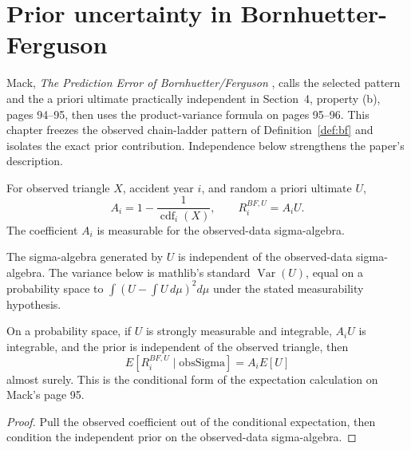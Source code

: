 \chapter{Prior uncertainty in Bornhuetter-Ferguson}

Mack, \emph{The Prediction Error of Bornhuetter/Ferguson} \cite{Mack2008BF}, calls the selected pattern and
the a priori ultimate practically independent in Section~4, property (b), pages 94--95, then
uses the product-variance formula on pages 95--96. This chapter freezes the observed
chain-ladder pattern of Definition~\ref{def:bf} and isolates the exact prior contribution.
Independence below strengthens the paper's description.

\begin{definition}\label{def:bfPriorRv}\leanok
{}
For observed triangle $X$, accident year $i$, and random a priori ultimate $U$,
\[
  A_i = 1 - \frac{1}{\operatorname{cdf}_i(X)},
  \qquad R^{BF,U}_i = A_i U.
\]
The coefficient $A_i$ is measurable for the observed-data sigma-algebra.
\end{definition}

\begin{definition}\label{def:bfPriorIndep}\leanok
{}
The sigma-algebra generated by $U$ is independent of the observed-data sigma-algebra.
The variance below is mathlib's standard $\operatorname{Var}(U)$, equal on a probability
space to $\int (U-\int U\,d\mu)^2d\mu$ under the stated measurability hypothesis.
\end{definition}

\begin{theorem}\label{thm:bfPriorMean}\leanok
{}
On a probability space, if $U$ is strongly measurable and integrable, $A_iU$ is integrable,
and the prior is independent of the observed triangle, then
\[
  E[R^{BF,U}_i \mid \mathrm{obsSigma}] = A_i E[U]
\]
almost surely. This is the conditional form of the expectation calculation on Mack's page 95.
\end{theorem}
\begin{proof}\leanok Pull the observed coefficient out of the conditional expectation, then
condition the independent prior on the observed-data sigma-algebra. \end{proof}

